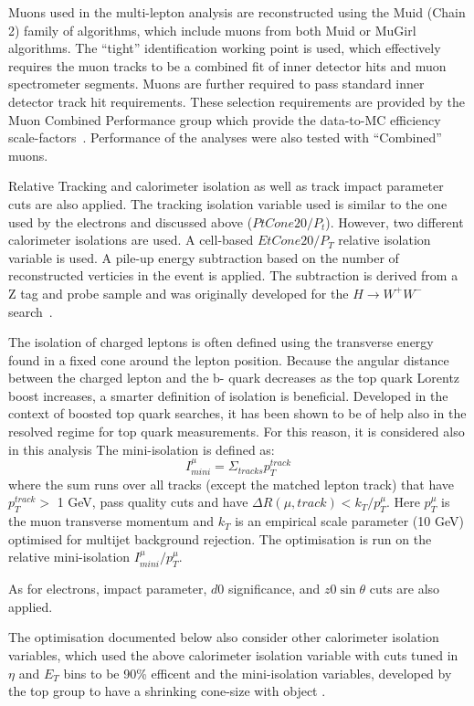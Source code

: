 Muons used in the multi-lepton analysis are reconstructed using the Muid (Chain 2)
family of algorithms, which include muons from both Muid or MuGirl algorithms.
The ``tight'' identification working point is used, which effectively requires
the muon tracks to be a combined fit of inner detector hits and muon
spectrometer segments.  Muons are further required
to pass standard inner detector track hit requirements. These
selection requirements are provided by the Muon Combined Performance group which
provide the data-to-MC efficiency scale-factors~\cite{MCP2012}.  
Performance of the analyses were also tested with ``Combined'' muons.

Relative Tracking and calorimeter isolation as well as track impact parameter
cuts are also applied. The tracking isolation variable used is similar to the one
used by the electrons and discussed above ($PtCone20/P_t$). However, two different
calorimeter isolations are used. A cell-based $EtCone20/P_T$ relative
isolation variable is used. A pile-up energy subtraction based 
on the number of reconstructed verticies in the event is applied. The
subtraction is derived from a Z tag and probe sample and was originally
developed for the $H\rightarrow W^{+} W^{-}$ search~\cite{HSG3Objects}. 

The isolation of charged leptons is often defined using the transverse energy found in a fixed cone
around the lepton position. Because the angular distance between the charged lepton and the b-
quark decreases as the top quark Lorentz boost increases, a smarter definition of isolation is beneficial. Developed in the context of boosted top quark searches, it has been shown to be of help also in the resolved regime for top quark measurements.
For this reason, it is considered also in this analysis
The mini-isolation is defined as: 
\begin{equation}
I^{\mu}_{mini}=\Sigma_{tracks} p_T^{track}
\end{equation}
where the sum runs over all tracks (except the matched lepton track) that have $p_T^{track} >$ 1 GeV, pass quality cuts and have $\Delta R(\mu, track) < k_T /p_T^\mu$. Here $p_T^\mu$ is the muon transverse momentum and $k_T$ is an
empirical scale parameter (10 GeV) optimised for multijet background rejection. The optimisation is run on the relative mini-isolation $I^{\mu}_{mini}/p_T^\mu$. 

As for
electrons, impact parameter, $d0$ significance, and $z0\sin{\theta}$ cuts are
also applied. 

The optimisation documented below also consider other calorimeter isolation variables,
which used the above calorimeter isolation variable with cuts tuned in $\eta$ 
and $E_T$ bins to be 90\% efficent and the mini-isolation variables, developed
by the top group to have a shrinking cone-size with object \pt \cite{MiniIso}.  


